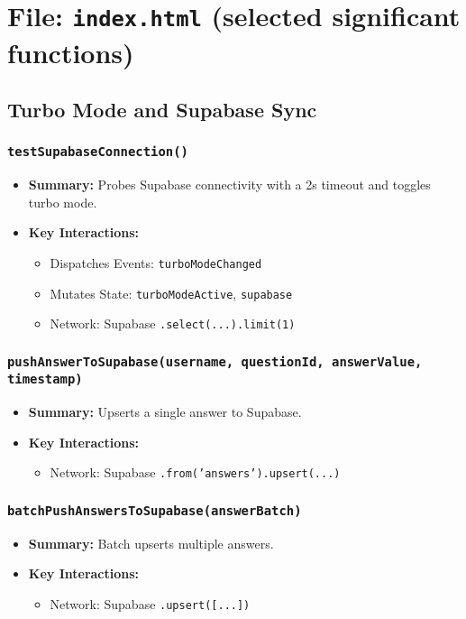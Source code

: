 \documentclass[11pt,letterpaper]{article}
\begin{document}
\section{File: \texttt{index.html} (selected significant functions)}

\subsection{Turbo Mode and Supabase Sync}

\subsubsection{\texttt{testSupabaseConnection()}}
\begin{itemize}
    \item \textbf{Summary:} Probes Supabase connectivity with a 2s timeout and toggles turbo mode.
    \item \textbf{Key Interactions:}
    \begin{itemize}
        \item Dispatches Events: \texttt{turboModeChanged}
        \item Mutates State: \texttt{turboModeActive}, \texttt{supabase}
        \item Network: Supabase \texttt{.select(...).limit(1)}
    \end{itemize}
\end{itemize}

\subsubsection{\texttt{pushAnswerToSupabase(username, questionId, answerValue, timestamp)}}
\begin{itemize}
    \item \textbf{Summary:} Upserts a single answer to Supabase.
    \item \textbf{Key Interactions:}
    \begin{itemize}
        \item Network: Supabase \texttt{.from('answers').upsert(...)}
    \end{itemize}
\end{itemize}

\subsubsection{\texttt{batchPushAnswersToSupabase(answerBatch)}}
\begin{itemize}
    \item \textbf{Summary:} Batch upserts multiple answers.
    \item \textbf{Key Interactions:}
    \begin{itemize}
        \item Network: Supabase \texttt{.upsert([...])}
    \end{itemize}
\end{itemize}
\end{document}
